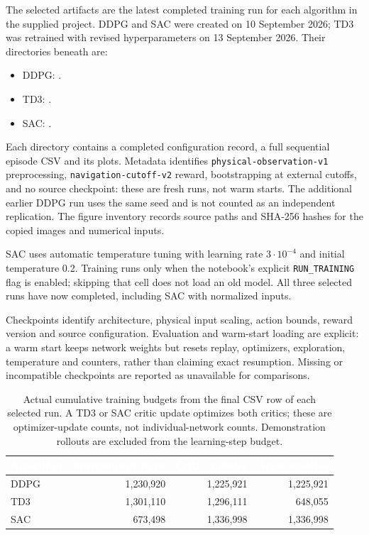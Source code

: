 \documentclass[11pt,a4paper]{article}
\theoremstyle{definition}
\theoremstyle{plain}
\theoremstyle{remark}
\newcommand{\code}[1]{\texttt{#1}}
\newcommand{\thcell}[1]{\textcolor{white}{\textbf{#1}}}
\begin{document}
The selected artifacts are the latest completed training run for each algorithm in the supplied project. DDPG and SAC were created on 10 September 2026; TD3 was retrained with revised hyperparameters on 13 September 2026. Their directories beneath  are:
\begin{itemize}
 \item DDPG: .
 \item TD3: .
 \item SAC: .
\end{itemize}
Each directory contains a completed configuration record, a full sequential episode CSV and its plots. Metadata identifies \code{physical-observation-v1} preprocessing, \code{navigation-cutoff-v2} reward, bootstrapping at external cutoffs, and no source checkpoint: these are fresh runs, not warm starts. The additional earlier DDPG run uses the same seed and is not counted as an independent replication. The figure inventory records source paths and SHA-256 hashes for the copied images and numerical inputs.

SAC uses automatic temperature tuning with learning rate $3\cdot10^{-4}$ and initial temperature 0.2. Training runs only when the notebook's explicit \code{RUN\_TRAINING} flag is enabled; skipping that cell does not load an old model. All three selected runs have now completed, including SAC with normalized inputs.

Checkpoints identify architecture, physical input scaling, action bounds, reward version and source configuration. Evaluation and warm-start loading are explicit: a warm start keeps network weights but resets replay, optimizers, exploration, temperature and counters, rather than claiming exact resumption. Missing or incompatible checkpoints are reported as unavailable for comparisons.

\begin{table}[h!]
\centering\small
\begin{tabularx}{\linewidth}{@{}Yrrr@{}}
\toprule
{}\thcell{Algorithm}&\thcell{Environment steps}&\thcell{Critic updates}&\thcell{Actor updates}\\
\midrule
DDPG&1,230,920&1,225,921&1,225,921\\
 TD3&1,301,110&1,296,111&648,055\\
SAC&673,498&1,336,998&1,336,998\\
\bottomrule
\end{tabularx}
\caption{Actual cumulative training budgets from the final CSV row of each selected run. A TD3 or SAC critic update optimizes both critics; these are optimizer-update counts, not individual-network counts. Demonstration rollouts are excluded from the learning-step budget.}
\label{tab:actual-budgets}
\end{table}
\end{document}
